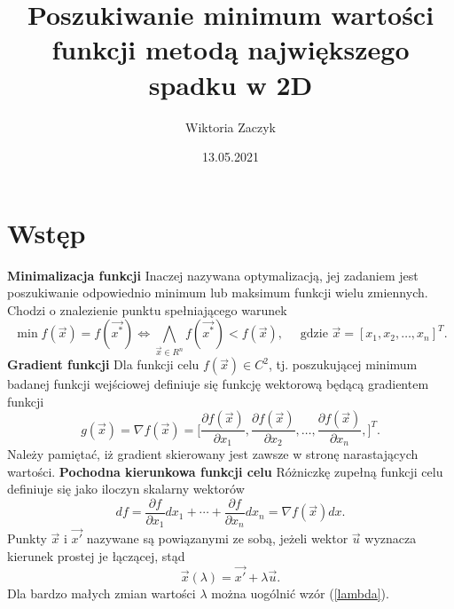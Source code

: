 \documentclass{article}
\begin{document}
\title{Poszukiwanie minimum wartości funkcji metodą największego spadku
w 2D}
\author{Wiktoria Zaczyk}
\date{13.05.2021}

\maketitle	


\section{Wstęp}

\textbf{Minimalizacja funkcji}
\newline
Inaczej nazywana optymalizacją, jej zadaniem jest poszukiwanie odpowiednio minimum lub maksimum funkcji wielu zmiennych. Chodzi o znalezienie punktu spełniającego warunek
\begin{equation}
\min f(\vec{x}) = f(\vec{x^{*}}) \Leftrightarrow \bigwedge_{\vec{x} \in R^n} f(\vec{x^{*}}) < f(\vec{x}), \quad \text{ gdzie } \vec{x} = [x_1, x_2, \dots, x_n]^{T}.
\end{equation}
\textbf{Gradient funkcji}
\newline
Dla funkcji celu $f(\vec{x}) \in C^2$, tj. poszukującej minimum badanej funkcji wejściowej definiuje się funkcję wektorową będącą gradientem funkcji
\begin{equation}
g(\vec{x}) = \nabla f(\vec{x}) = \bigg[ \frac{\partial f(\vec{x})}{\partial x_1}, \frac{\partial f(\vec{x})}{\partial x_2}, \dots, \frac{\partial f(\vec{x})}{\partial x_n}, \bigg]^{T}.
\end{equation}
Należy pamiętać, iż gradient skierowany jest zawsze w stronę narastających wartości.
\newline\newline
\textbf{Pochodna kierunkowa funkcji celu}
\newline
Różniczkę zupełną funkcji celu definiuje się jako iloczyn skalarny wektorów
\begin{equation}
df = \frac{\partial f}{\partial x_1} dx_1 +  \cdots + \frac{\partial f}{\partial x_n} dx_n = \nabla f(\vec{x}) dx.
\end{equation}
Punkty  $\vec{x}$ i $\vec{x'}$ nazywane są powiązanymi ze sobą, jeżeli wektor $\vec{u}$ wyznacza kierunek prostej je łączącej, stąd
\begin{equation}
\vec{x}(\lambda) = \vec{x'} + \lambda \vec{u} .
\label{lambda}
\end{equation}
Dla bardzo małych zmian wartości $\lambda$ można uogólnić wzór (\ref{lambda}).
\end{document}
